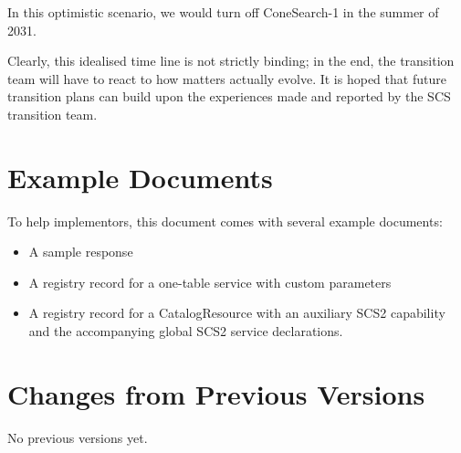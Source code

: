 \documentclass[11pt,a4paper]{ivoa}
\begin{document}
In this optimistic scenario, we would turn off ConeSearch-1 in the
summer of 2031.

Clearly, this idealised time line is not strictly binding; in the end,
the transition team will have to react to how matters actually evolve.
It is hoped that future transition plans can build upon the experiences
made and reported by the SCS transition team.

\section{Example Documents}
\label{app:examples}

To help implementors, this document comes with several example documents:

\begin{itemize}
\item A sample response
\item A registry record for a one-table service with custom parameters
\item A registry record for a CatalogResource with an auxiliary SCS2
capability and the accompanying global SCS2 service declarations.
\end{itemize}

\section{Changes from Previous Versions}

No previous versions yet.



\end{document}
